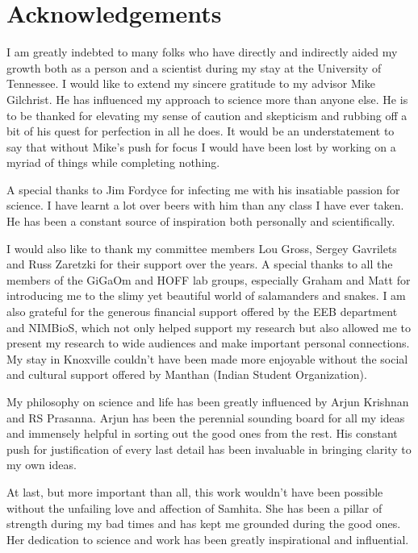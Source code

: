 \chapter*{Acknowledgements}
I am greatly indebted to many folks who have directly and indirectly aided my growth both as a person and a scientist during my stay at the University of Tennessee.
I would like to extend my sincere gratitude to my advisor Mike Gilchrist.
He has influenced my approach to science more than anyone else.
He is to be thanked for elevating my sense of caution and skepticism and rubbing off a bit of his quest for perfection in all he does.
It would be an understatement to say that without Mike's push for focus I would have been lost by working on a myriad of things while completing nothing.

A special thanks to Jim Fordyce for infecting me with his insatiable passion for science.
I have learnt a lot over beers with him than any class I have ever taken.
He has been a constant source of inspiration both personally and scientifically.

I would also like to thank my committee members Lou Gross, Sergey Gavrilets and Russ Zaretzki for their support over the years.
A special thanks to all the members of the GiGaOm and HOFF lab groups, especially Graham and Matt for introducing me to the slimy yet beautiful world of salamanders and snakes.
I am also grateful for the generous financial support offered by the EEB department and NIMBioS, which not only helped support my research but also allowed me to present my research to wide audiences and make important personal connections.
My stay in Knoxville couldn't have been made more enjoyable without the social and cultural support offered by Manthan (Indian Student Organization).

My philosophy on science and life has been greatly influenced by Arjun Krishnan and RS Prasanna.
Arjun has been the perennial sounding board for all my ideas and immensely helpful in sorting out the good ones from the rest.
His constant push for justification of every last detail has been invaluable in bringing clarity to my own ideas. 

At last, but more important than all, this work wouldn't have been possible without the unfailing love and affection of Samhita.
She has been a pillar of strength during my bad times and has kept me grounded during the good ones.
Her dedication to science and work has been greatly inspirational and influential.

